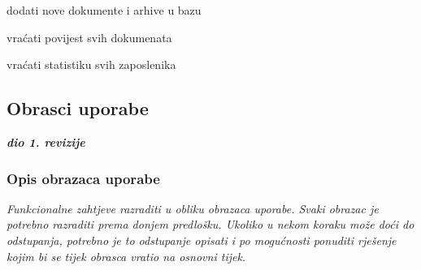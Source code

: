 \begin{packed_enum}
				\item  {}
				
				\begin{packed_enum}
					
					\item dodati nove dokumente i arhive u bazu
					\item vraćati povijest svih dokumenata
					\item vraćati statistiku svih zaposlenika
					
				\end{packed_enum}	
			
			\end{packed_enum}
			
			
			\eject 
			
			
				
			\subsection{Obrasci uporabe}
				
				\textbf{\textit{dio 1. revizije}}
				
				\subsubsection{Opis obrazaca uporabe}
					\textit{Funkcionalne zahtjeve razraditi u obliku obrazaca uporabe. Svaki obrazac je potrebno razraditi prema donjem predlošku. Ukoliko u nekom koraku može doći do odstupanja, potrebno je to odstupanje opisati i po mogućnosti ponuditi rješenje kojim bi se tijek obrasca vratio na osnovni tijek.}\\
					

